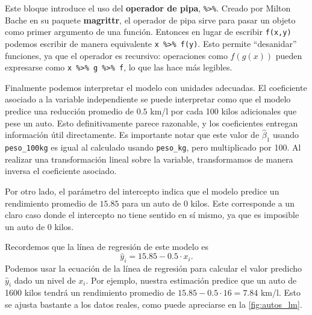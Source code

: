 \documentclass{report}\usepackage[]{graphicx}\usepackage[]{color}
\makeatletter
\newcommand*{\paq}[1]{\textbf{#1}\index{#1@\textbf{#1}}}
\newcommand*{\kw}[1]{\textbf{#1}\index{#1}}
\makeatother
\begin{document}
\begin{Rbox}
Este bloque introduce el uso del \kw{operador de pipa}, \verb|%>%|.
Creado por Milton Bache en su paquete \paq{magrittr}, el operador de pipa sirve para pasar un objeto como primer argumento de una función.
Entonces en lugar de escribir \verb|f(x,y)| podemos escribir de manera equivalente \verb|x %>% f(y)|.
Esto permite ``desanidar'' funciones, ya que el operador es recursivo: operaciones como $f(g(x))$ pueden expresarse como \verb|x %>% g %>% f|, lo que las hace más legibles.
\end{Rbox}

Finalmente podemos interpretar el modelo con unidades adecuadas.
El coeficiente asociado a la variable independiente se puede interpretar como que el modelo predice una reducción promedio de $0.5$ km/l por cada 100 kilos adicionales que pese un auto.
Esto definitivamente parece razonable, y los coeficientes entregan información útil directamente.
Es importante notar que este valor de $\hat\beta_1$ usando \verb|peso_100kg| es igual al calculado usando \verb|peso_kg|, pero multiplicado por 100. Al realizar una transformación lineal sobre la variable, transformamos de manera inversa el coeficiente asociado.

Por otro lado, el parámetro del intercepto indica que el modelo predice un rendimiento promedio de $15.85$ para un auto de 0 kilos.
Este corresponde a un claro caso donde el intercepto no tiene sentido en sí mismo, ya que es imposible un auto de 0 kilos.

Recordemos que la línea de regresión de este modelo es
\begin{equation*}
\hat y_i = 15.85 -0.5 \cdot x_i.
\end{equation*}
Podemos usar la ecuación de la línea de regresión para calcular el valor predicho $\hat y_i$ dado un nivel de $x_i$. Por ejemplo, nuestra estimación predice que un auto de 1600 kilos tendrá un rendimiento promedio de $15.85 -0.5 \cdot 16 = 7.84$ km/l.
Esto se ajusta bastante a los datos reales, como puede apreciarse en la \autoref{fig:autos_lm}.
\end{document}
